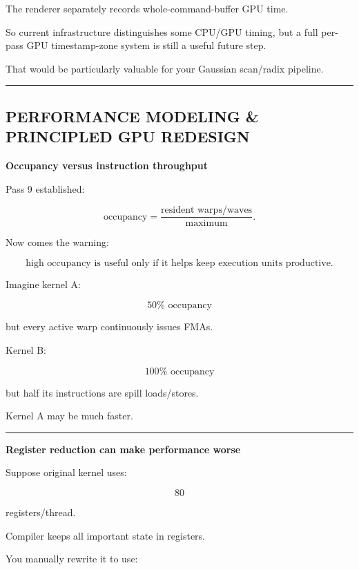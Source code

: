 The renderer separately records whole-command-buffer GPU time.

So current infrastructure distinguishes some CPU/GPU timing, but a full per-pass GPU timestamp-zone system is still a useful future step.

That would be particularly valuable for your Gaussian scan/radix pipeline.

\begin{center}\rule{0.5\linewidth}{0.5pt}\end{center}

\subsection{PERFORMANCE MODELING \& PRINCIPLED GPU REDESIGN}\label{01-foundations-i-ch012-performance-modeling-principled-gpu-redesign}

\hypertarget{01-foundations-i-ch012-performance-modeling-principled-gpu-redesign}{}

\textbf{Occupancy versus instruction throughput}

Pass 9 established:

\[
\text{occupancy}
=
\frac{
\text{resident warps/waves}
}{
\text{maximum}
}.
\]

Now comes the warning:

\[
\boxed{
\text{high occupancy is useful only if it helps keep execution units productive}.
}
\]

Imagine kernel A:

\[
50\%\text{ occupancy}
\]

but every active warp continuously issues FMAs.

Kernel B:

\[
100\%\text{ occupancy}
\]

but half its instructions are spill loads/stores.

Kernel A may be much faster.

\begin{center}\rule{0.5\linewidth}{0.5pt}\end{center}

\textbf{Register reduction can make performance worse}

Suppose original kernel uses:

\[
80
\]

registers/thread.

Compiler keeps all important state in registers.

You manually rewrite it to use:

